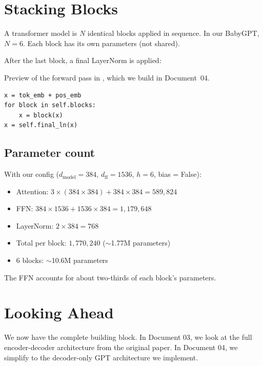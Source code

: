 \section{Stacking Blocks}

A transformer model is $N$ identical blocks applied in sequence. In our BabyGPT, $N = 6$. Each block has its own parameters (not shared).

After the last block, a final LayerNorm is applied:

Preview of the forward pass in , which we build in Document~04.

\concepttag
\begin{lstlisting}
x = tok_emb + pos_emb
for block in self.blocks:
    x = block(x)
x = self.final_ln(x)
\end{lstlisting}

\subsection{Parameter count}

With our config ($d_{\text{model}} = 384$, $d_{\text{ff}} = 1536$, $h = 6$, bias = False):

\begin{itemize}
  \item Attention: $3 \times (384 \times 384) + 384 \times 384 = 589{,}824$
  \item FFN: $384 \times 1536 + 1536 \times 384 = 1{,}179{,}648$
  \item LayerNorm: $2 \times 384 = 768$
  \item Total per block: $1{,}770{,}240$ ($\sim$1.77M parameters)
  \item 6 blocks: $\sim$10.6M parameters
\end{itemize}

The FFN accounts for about two-thirds of each block's parameters.

\section{Looking Ahead}

We now have the complete building block. In Document 03, we look at the full encoder-decoder architecture from the original paper. In Document 04, we simplify to the decoder-only GPT architecture we implement.


